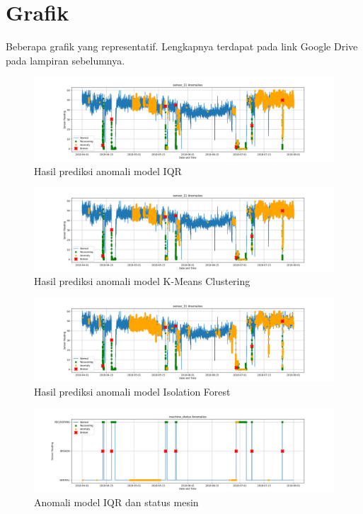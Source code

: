 \chapter{Grafik}

Beberapa grafik yang representatif. Lengkapnya terdapat pada link Google Drive pada lampiran sebelumnya.

\begin{figure}[h]
    \centerline{\includegraphics[width=1.4\textwidth]{resources/Acuan/IQR_sensor_11.png}}
    \caption{Hasil prediksi anomali model IQR} \label{IQR11}
\end{figure}
\begin{figure}[h]
    \centerline{\includegraphics[width=1.4\textwidth]{resources/Acuan/KMeans_sensor_11.png}}
    \caption{Hasil prediksi anomali model K-Means Clustering} \label{KM11}
\end{figure}
\begin{figure}[h]
    \centerline{\includegraphics[width=1.4\textwidth]{resources/Acuan/IsoFor_sensor_11.png}}
    \caption{Hasil prediksi anomali model Isolation Forest} \label{IF11}
\end{figure}
\begin{figure}[h]
    \centerline{\includegraphics[width=1.4\textwidth]{resources/Acuan/IQR_machine_status.png}}
    \caption{Anomali model IQR dan status mesin} \label{IQRms}
\end{figure}
